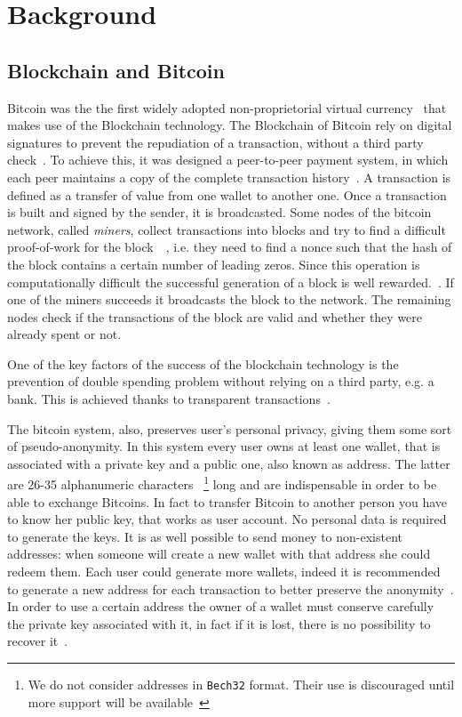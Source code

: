 \section{Background} \label{background}
\subsection{Blockchain and Bitcoin}
Bitcoin was the the first widely adopted non-proprietorial virtual
currency~\cite{bib:respCrypto} that makes use of the
Blockchain technology. The Blockchain of Bitcoin rely on digital
signatures to prevent the repudiation of a transaction, without a third
party check~\cite{bib:anonAnalysis}.
To achieve this, it was designed a peer-to-peer payment system,
in which each peer maintains a copy of the complete transaction
history~\cite{bib:fistful}. 
A transaction is defined as a transfer of value
from one wallet to another one. Once a transaction is built and signed by the
sender, it is broadcasted. Some nodes of the bitcoin network, called
\textit{miners}, collect transactions into blocks and try to find a difficult
proof-of-work for the block~\cite{bib:pricing}~\cite{bib:hashcash}, i.e. they
need to find a nonce such that the hash of the block contains a certain number
of leading zeros. Since this operation is
computationally difficult the successful generation of a block is well
rewarded.~\cite{bib:satoshi}. If one of the miners succeeds it broadcasts the
block to the network. The remaining nodes check if the transactions of the
block are valid and whether they were already spent or not. 

One of the key factors of the success of the blockchain technology
is the prevention of double spending problem without relying on a third party,
e.g. a bank. This is achieved thanks to transparent
transactions~\cite{bib:bitcoinbeyond}.

The bitcoin system, also, preserves user's personal privacy, giving them some
sort of pseudo-anonymity. In this system every user owns at least one wallet,
that is associated with a private key and a public one, also known as address.
The latter are 26-35 alphanumeric characters~\cite{bib:bitcoinwiki:address}
\footnote{We do not consider addresses in \texttt{Bech32} format. Their use is
discouraged until more support will be available~\cite{bib:bitcoinwiki:bech32}}
long and are indispensable in order to be able to exchange Bitcoins.
In fact to transfer Bitcoin to another person you have to know her
public key, that works as user account. No personal data is required to generate
the keys. It is as well possible to send money to non-existent addresses: when
someone will create a new wallet with that address she could redeem
them. Each user could generate more wallets, indeed it is recommended
to generate a new address for each transaction to better preserve the
anonymity~\cite{bib:satoshi}. In order to use a certain address the owner of
a wallet must conserve carefully the private key associated with it, in fact
if it is lost, there is no possibility to recover it~\cite{bib:respCrypto}.


